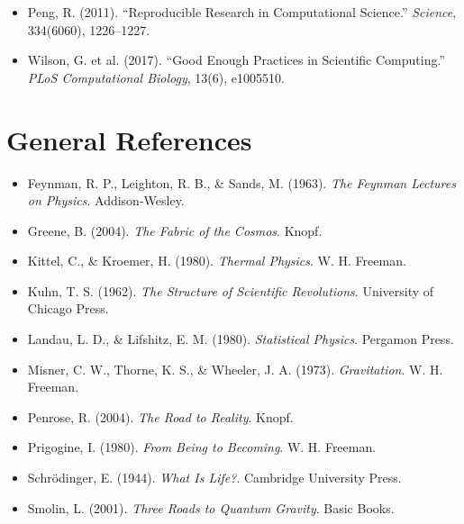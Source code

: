 \documentclass[11pt, letterpaper, openany]{book}
\begin{document}
\begin{itemize}
\item Peng, R. (2011). “Reproducible Research in Computational Science.” \textit{Science}, 334(6060), 1226–1227.
\item Wilson, G. et al. (2017). “Good Enough Practices in Scientific Computing.” \textit{PLoS Computational Biology}, 13(6), e1005510.

\end{itemize}

\section*{General References}

\begin{itemize}
\item Feynman, R. P., Leighton, R. B., \& Sands, M. (1963). \textit{The Feynman Lectures on Physics}. Addison-Wesley.
\item Greene, B. (2004). \textit{The Fabric of the Cosmos}. Knopf.
\item Kittel, C., \& Kroemer, H. (1980). \textit{Thermal Physics}. W. H. Freeman.
\item Kuhn, T. S. (1962). \textit{The Structure of Scientific Revolutions}. University of Chicago Press.
\item Landau, L. D., \& Lifshitz, E. M. (1980). \textit{Statistical Physics}. Pergamon Press.
\item Misner, C. W., Thorne, K. S., \& Wheeler, J. A. (1973). \textit{Gravitation}. W. H. Freeman.
\item Penrose, R. (2004). \textit{The Road to Reality}. Knopf.
\item Prigogine, I. (1980). \textit{From Being to Becoming}. W. H. Freeman.
\item Schrödinger, E. (1944). \textit{What Is Life?}. Cambridge University Press.
\item Smolin, L. (2001). \textit{Three Roads to Quantum Gravity}. Basic Books.
\end{itemize}

\appendix
\end{document}
